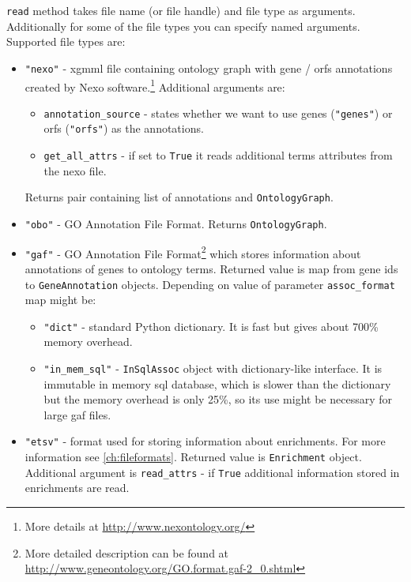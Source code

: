 \documentclass{report}
\begin{document}
\verb|read| method takes file name (or file handle) and file type as arguments.
Additionally for some of the file types you can specify named arguments.
Supported file types are:
\begin{itemize}
\item \verb|"nexo"| - xgmml file containing ontology graph with gene / orfs
annotations created by Nexo software.\footnote{More details at \url{http://www.nexontology.org/}}
Additional arguments are:
\begin{itemize}
\item \verb|annotation_source| - states whether we want to use genes (\verb|"genes"|)
or orfs (\verb|"orfs"|) as the annotations.
\item \verb|get_all_attrs| - if set to \verb|True| it reads additional terms attributes
from the nexo file.
\end{itemize}
Returns pair containing list of annotations and \verb|OntologyGraph|. 
\item \verb|"obo"| - GO Annotation File Format. Returns
\verb|OntologyGraph|.
\item \verb|"gaf"| - GO Annotation File Format\footnote{More detailed description
can be found at \url{http://www.geneontology.org/GO.format.gaf-2_0.shtml}}
which stores information about annotations of genes to ontology terms.
Returned value is map from gene ids to \verb|GeneAnnotation| objects.
Depending on value of parameter \verb|assoc_format| map might be:
\begin{itemize}
\item \verb|"dict"| - standard Python dictionary. It is fast but
gives about 700\% memory overhead.
\item \verb|"in_mem_sql"| - \verb|InSqlAssoc| object with
dictionary-like interface. It is immutable in memory sql database, which
is slower than the dictionary but the memory overhead is only 25\%, so its use might be necessary for large gaf files.
\end{itemize}
\item \verb|"etsv"| - format used for storing information about
enrichments. For more information see \ref{ch:fileformats}. Returned
value is \verb|Enrichment| object. Additional argument is
\verb|read_attrs| - if \verb|True| additional information stored
in enrichments are read.
\end{itemize}
\end{document}
